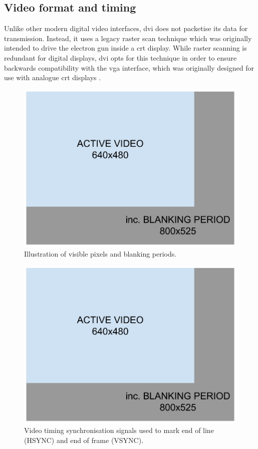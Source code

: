 \subsection{Video format and timing}

Unlike other modern digital video interfaces, \gls{dvi} does not packetise its data for transmission. Instead, it uses a legacy raster scan technique which was originally intended to drive the electron gun inside a \gls{crt} display. While raster scanning is redundant for digital displays, \gls{dvi} opts for this technique in order to ensure backwards compatibility with the \gls{vga} interface, which was originally designed for use with analogue \gls{crt} displays \cite{dvi_spec}.

\begin{figure}
  \centering
  \includegraphics[width=1\textwidth]{./img/raster_scan.png}
  \caption{Illustration of visible pixels and blanking periods.}
  \label{fig:raster_scan}
\end{figure}

\begin{figure}
  \centering
  \includegraphics[width=1\textwidth]{./img/raster_scan.png}
  \caption{Video timing synchronisation signals used to mark end of line (HSYNC) and end of frame (VSYNC).}
  \label{fig:video_timing_signals}
\end{figure}

